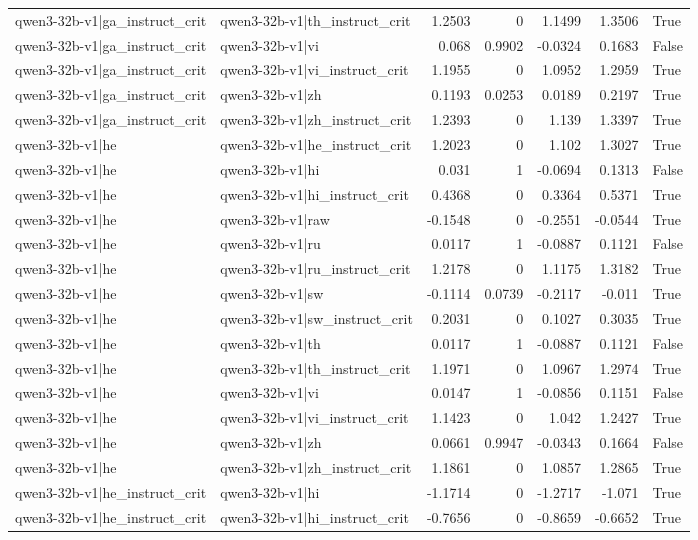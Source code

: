 \begin{table}
\begin{tabular}{l l r r r r l}
qwen3-32b-v1|ga_instruct_crit & qwen3-32b-v1|th_instruct_crit & 1.2503 & 0 & 1.1499 & 1.3506 & True \\
qwen3-32b-v1|ga_instruct_crit & qwen3-32b-v1|vi & 0.068 & 0.9902 & -0.0324 & 0.1683 & False \\
qwen3-32b-v1|ga_instruct_crit & qwen3-32b-v1|vi_instruct_crit & 1.1955 & 0 & 1.0952 & 1.2959 & True \\
qwen3-32b-v1|ga_instruct_crit & qwen3-32b-v1|zh & 0.1193 & 0.0253 & 0.0189 & 0.2197 & True \\
qwen3-32b-v1|ga_instruct_crit & qwen3-32b-v1|zh_instruct_crit & 1.2393 & 0 & 1.139 & 1.3397 & True \\
qwen3-32b-v1|he & qwen3-32b-v1|he_instruct_crit & 1.2023 & 0 & 1.102 & 1.3027 & True \\
qwen3-32b-v1|he & qwen3-32b-v1|hi & 0.031 & 1 & -0.0694 & 0.1313 & False \\
qwen3-32b-v1|he & qwen3-32b-v1|hi_instruct_crit & 0.4368 & 0 & 0.3364 & 0.5371 & True \\
qwen3-32b-v1|he & qwen3-32b-v1|raw & -0.1548 & 0 & -0.2551 & -0.0544 & True \\
qwen3-32b-v1|he & qwen3-32b-v1|ru & 0.0117 & 1 & -0.0887 & 0.1121 & False \\
qwen3-32b-v1|he & qwen3-32b-v1|ru_instruct_crit & 1.2178 & 0 & 1.1175 & 1.3182 & True \\
qwen3-32b-v1|he & qwen3-32b-v1|sw & -0.1114 & 0.0739 & -0.2117 & -0.011 & True \\
qwen3-32b-v1|he & qwen3-32b-v1|sw_instruct_crit & 0.2031 & 0 & 0.1027 & 0.3035 & True \\
qwen3-32b-v1|he & qwen3-32b-v1|th & 0.0117 & 1 & -0.0887 & 0.1121 & False \\
qwen3-32b-v1|he & qwen3-32b-v1|th_instruct_crit & 1.1971 & 0 & 1.0967 & 1.2974 & True \\
qwen3-32b-v1|he & qwen3-32b-v1|vi & 0.0147 & 1 & -0.0856 & 0.1151 & False \\
qwen3-32b-v1|he & qwen3-32b-v1|vi_instruct_crit & 1.1423 & 0 & 1.042 & 1.2427 & True \\
qwen3-32b-v1|he & qwen3-32b-v1|zh & 0.0661 & 0.9947 & -0.0343 & 0.1664 & False \\
qwen3-32b-v1|he & qwen3-32b-v1|zh_instruct_crit & 1.1861 & 0 & 1.0857 & 1.2865 & True \\
qwen3-32b-v1|he_instruct_crit & qwen3-32b-v1|hi & -1.1714 & 0 & -1.2717 & -1.071 & True \\
qwen3-32b-v1|he_instruct_crit & qwen3-32b-v1|hi_instruct_crit & -0.7656 & 0 & -0.8659 & -0.6652 & True \\

\end{tabular}
\end{table}
